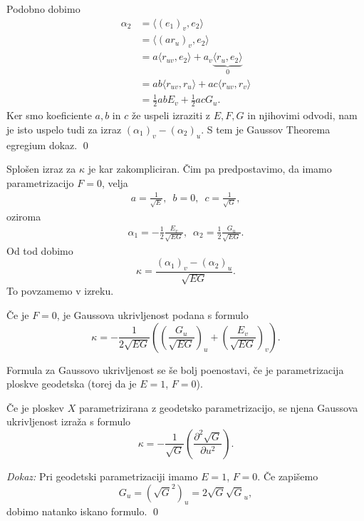Podobno dobimo \begin{align*}
    \alpha_2 &= \langle (e_1)_v, e_2 \rangle  \\
     &= \langle (a r_u)_v, e_2 \rangle  \\
     &= a \langle r_{uv}, e_2 \rangle + a_v \underbrace{\langle r_u, e_2 \rangle}_0  \\
    &= ab \langle r_{uv}, r_u \rangle + ac \langle r_{uv}, r_v \rangle \\
    &= \frac{1}{2} ab E_v + \frac{1}{2}ac G_u. 
\end{align*}
Ker smo koeficiente $a, b$ in $c$ že uspeli izraziti z $E, F, G$ in njihovimi odvodi, nam je isto uspelo tudi za izraz $(\alpha_1)_v - (\alpha_2)_u$.
S tem je Gaussov Theorema egregium dokaz.
\qed

\begin{opomba}
Splošen izraz za $\kappa$ je kar zakompliciran. Čim pa predpostavimo, da imamo parametrizacijo $F =0$, velja \begin{align*}
    a = \frac{1}{\sqrt{E} }, \,\,\,  b = 0, \,\,\,   c = \frac{1}{\sqrt{G}},
\end{align*}oziroma \begin{align*}
    \alpha_1 = -\frac{1}{2} \frac{E_v}{\sqrt{EG} }, \,\,\, \alpha_2 = \frac{1}{2} \frac{G_u}{\sqrt{EG} }.
\end{align*}
Od tod dobimo \begin{equation*}
\kappa  = \frac{(\alpha_1)_v - (\alpha_2)_u}{\sqrt{EG}}.
\end{equation*}
To povzamemo v izreku.
\end{opomba}

\begin{izrek}
\label{izr_gaussova_ukrivljenost_v_primeru_F_enako_0}
Če je $F = 0$, je Gaussova ukrivljenost podana s formulo \begin{equation*}
\kappa = - \frac{1}{2\sqrt{EG}} \left(\left(  \frac{G_u}{\sqrt{EG} } \right)_u + \left( \frac{E_v}{\sqrt{EG} } \right)_v \right).
\end{equation*}  
\end{izrek}

Formula za Gaussovo ukrivljenost se še bolj poenostavi, če je parametrizacija ploskve geodetska (torej da je $E = 1$, $F = 0$).

\begin{izrek}
\label{izr_gaussova_ukrivljenost_pri_geodetski_parametrizaciji}
 Če je ploskev $X$ parametrizirana z geodetsko parametrizacijo, se njena Gaussova ukrivljenost izraža s formulo \begin{equation*}
 \kappa = - \frac{1}{\sqrt{G}} \left( \frac{ \partial^{2} \sqrt{G}  }{ \partial u^{2} }  \right).
 \end{equation*}  
\end{izrek}
\noindent
{\em Dokaz:\/}
Pri geodetski parametrizaciji imamo $E = 1$, $F = 0$. Če zapišemo \begin{equation*}
G_u = (\sqrt{G}^2)_u = 2 \sqrt{G} \sqrt{G}_u,   
\end{equation*}  
dobimo natanko iskano formulo.
\qed

